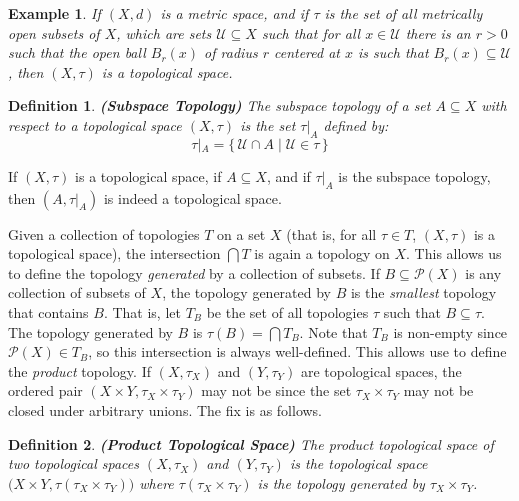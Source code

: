 \documentclass{article}
\theoremstyle{plain}
\theoremstyle{normal}
\newtheorem{definition}{Definition}[section]
\newtheorem{example}{Example}[section]
\begin{document}
        \begin{example}
            If $(X,d)$ is a metric space, and if $\tau$ is the set of all
            \textit{metrically open} subsets of $X$, which are sets
            $\mathcal{U}\subseteq{X}$ such that for all $x\in\mathcal{U}$ there
            is an $r>0$ such that the open ball $B_{r}(x)$ of radius $r$
            centered at $x$ is such that $B_{r}(x)\subseteq\mathcal{U}$, then
            $(X,\tau)$ is a topological space.
        \end{example}
        \begin{definition}{\textbf{(Subspace Topology)}}
            The subspace topology of a set $A\subseteq{X}$ with respect to a
            topological space $(X,\tau)$ is the set $\tau|_{A}$ defined by:
            \begin{equation}
                \tau|_{A}=\{\,\mathcal{U}\cap{A}\;|\;\mathcal{U}\in\tau\,\}
            \end{equation}
        \end{definition}
        If $(X,\tau)$ is a topological space, if $A\subseteq{X}$, and if
        $\tau|_{A}$ is the subspace topology, then $(A,\tau|_{A})$ is indeed
        a topological space.
        \par\hfill\par
        Given a collection of topologies $T$ on a set $X$ (that is, for all
        $\tau\in{T}$, $(X,\tau)$ is a topological space), the intersection
        $\bigcap{T}$ is again a topology on $X$. This allows us to define the
        topology \textit{generated} by a collection of subsets. If
        $B\subseteq\mathcal{P}(X)$ is any collection of subsets of $X$, the
        topology generated by $B$ is the \textit{smallest} topology that
        contains $B$. That is, let $T_{B}$ be the set of all topologies
        $\tau$ such that $B\subseteq\tau$. The topology generated by
        $B$ is $\tau(B)=\bigcap{T}_{B}$. Note that $T_{B}$ is non-empty since
        $\mathcal{P}(X)\in{T}_{B}$, so this intersection is always well-defined.
        This allows use to define the \textit{product} topology. If
        $(X,\tau_{X})$ and $(Y,\tau_{Y})$ are topological spaces, the ordered
        pair $(X\times{Y},\tau_{X}\times\tau_{Y})$ may not be since the set
        $\tau_{X}\times\tau_{Y}$ may not be closed under arbitrary unions.
        The fix is as follows.
        \begin{definition}{\textbf{(Product Topological Space)}}
            The product topological space of two topological spaces
            $(X,\tau_{X})$ and $(Y,\tau_{Y})$ is the topological space
            $\big(X\times{Y},\tau(\tau_{X}\times\tau_{Y})\big)$ where
            $\tau(\tau_{X}\times\tau_{Y})$ is the topology generated by
            $\tau_{X}\times\tau_{Y}$.
        \end{definition}
\end{document}
